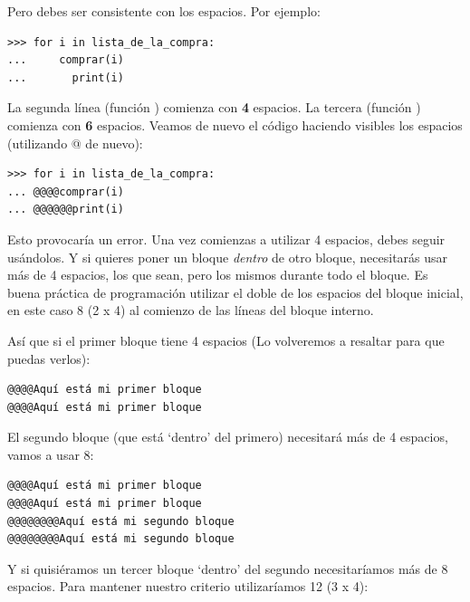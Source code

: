 Pero debes ser consistente con los espacios.  Por ejemplo:

\begin{listingignore}
\begin{verbatim}
>>> for i in lista_de_la_compra:
...     comprar(i)
...       print(i)
\end{verbatim}
\end{listingignore}

La segunda línea (función ) comienza con \textbf{4} espacios.  La tercera (función ) comienza con \textbf{6} espacios.  Veamos de nuevo el código haciendo visibles los espacios (utilizando @ de nuevo):

\begin{listingignore}
\begin{verbatim}
>>> for i in lista_de_la_compra:
... @@@@comprar(i)
... @@@@@@print(i)
\end{verbatim}
\end{listingignore}

Esto provocaría un error.  Una vez comienzas a utilizar 4 espacios, debes seguir usándolos.  Y si quieres poner un bloque \emph{dentro} de otro bloque, necesitarás usar más de 4 espacios, los que sean, pero los mismos durante todo el bloque.
Es buena práctica de programación utilizar el doble de los espacios del bloque inicial, en este caso 8 (2 x 4) al comienzo de las líneas del bloque interno. 
\par
Así que si el primer bloque tiene 4 espacios (Lo volveremos a resaltar para que puedas verlos):

\begin{listing}
\begin{verbatim}
@@@@Aquí está mi primer bloque
@@@@Aquí está mi primer bloque
\end{verbatim}
\end{listing}

El segundo bloque (que está `dentro' del primero) necesitará más de 4 espacios, vamos a usar 8:

\begin{listing}
\begin{verbatim}
@@@@Aquí está mi primer bloque
@@@@Aquí está mi primer bloque
@@@@@@@@Aquí está mi segundo bloque
@@@@@@@@Aquí está mi segundo bloque
\end{verbatim}
\end{listing}

Y si quisiéramos un tercer bloque `dentro' del segundo necesitaríamos más de 8 espacios. Para mantener nuestro criterio utilizaríamos 12 (3 x 4): 


